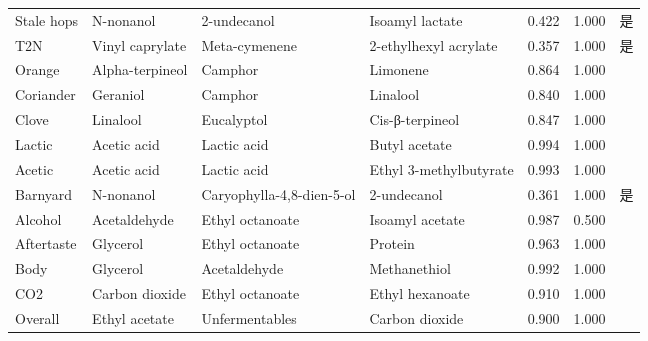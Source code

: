 {\begin{longtable}{llllrrl}
Stale hops & N-nonanol & 2-undecanol & Isoamyl lactate & 0.422 & 1.000 & 是 \\
T2N & Vinyl caprylate & Meta-cymenene & 2-ethylhexyl acrylate & 0.357 & 1.000 & 是 \\
Orange & Alpha-terpineol & Camphor & Limonene & 0.864 & 1.000 &  \\
Coriander & Geraniol & Camphor & Linalool & 0.840 & 1.000 &  \\
Clove & Linalool & Eucalyptol & Cis-β-terpineol & 0.847 & 1.000 &  \\
Lactic & Acetic acid & Lactic acid & Butyl acetate & 0.994 & 1.000 &  \\
Acetic & Acetic acid & Lactic acid & Ethyl 3-methylbutyrate & 0.993 & 1.000 &  \\
Barnyard & N-nonanol & Caryophylla-4,8-dien-5-ol & 2-undecanol & 0.361 & 1.000 & 是 \\
Alcohol & Acetaldehyde & Ethyl octanoate & Isoamyl acetate & 0.987 & 0.500 &  \\
Aftertaste & Glycerol & Ethyl octanoate & Protein & 0.963 & 1.000 &  \\
Body & Glycerol & Acetaldehyde & Methanethiol & 0.992 & 1.000 &  \\
CO2 & Carbon dioxide & Ethyl octanoate & Ethyl hexanoate & 0.910 & 1.000 &  \\
Overall & Ethyl acetate & Unfermentables & Carbon dioxide & 0.900 & 1.000 &  \\
\end{longtable}
}
